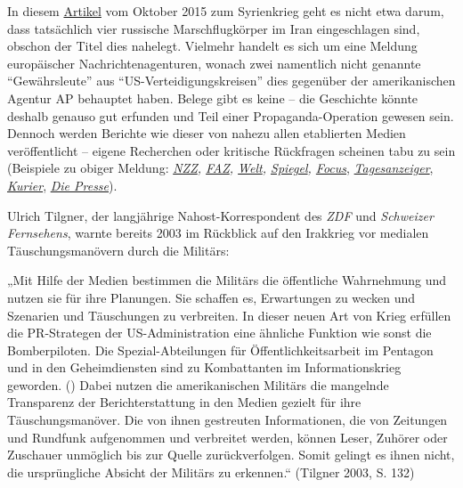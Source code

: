 In diesem
\href{http://www.tagesanzeiger.ch/ausland/asien-und-ozeanien/Vier-russische-Marschflugkoerper-im-Iran-eingeschlagen/story/19373226}{Artikel}
vom Oktober 2015 zum Syrienkrieg geht es nicht etwa darum, dass
tatsächlich vier russische Marschflugkörper im Iran eingeschlagen sind,
obschon der Titel dies nahelegt. Vielmehr handelt es sich um eine
Meldung europäischer Nachrichtenagenturen, wonach zwei namentlich nicht
genannte ``Gewährsleute'' aus ``US-Verteidigungskreisen'' dies gegenüber
der amerikanischen Agentur AP behauptet haben. Belege gibt es keine --
die Geschichte könnte deshalb genauso gut erfunden und Teil einer
Propaganda-Operation gewesen sein. Dennoch werden Berichte wie dieser
von nahezu allen etablierten Medien veröffentlicht -- eigene Recherchen
oder kritische Rückfragen scheinen tabu zu sein (Beispiele zu obiger
Meldung:
\emph{\href{http://www.nzz.ch/international/naher-osten-und-nordafrika/russische-raketen-offenbar-statt-in-syrien-im-iran-eingeschlagen-1.18626791}{NZZ},
\href{http://www.faz.net/aktuell/politik/ausland/naher-osten/auf-dem-weg-nach-syrien-sollen-russische-raketen-in-iran-eingeschlagen-sein-13846834.html}{FAZ},
\href{http://www.welt.de/politik/ausland/article147399821/Russische-Raketen-schlagen-offenbar-im-Iran-ein.html}{Welt},
\href{http://www.spiegel.de/politik/ausland/russische-raketen-laut-usa-in-iran-eingeschlagen-a-1056938.html}{Spiegel},
\href{http://www.focus.de/politik/ausland/us-offizielle-berichten-vier-russische-marschflugkoerper-im-iran-eingeschlagen_id_5001154.html}{Focus}},
\href{http://www.tagesanzeiger.ch/ausland/asien-und-ozeanien/Vier-russische-Marschflugkoerper-im-Iran-eingeschlagen/story/19373226}{\emph{Tagesanzeiger}},
\emph{\href{http://kurier.at/politik/ausland/russische-marschflugkoerper-im-iran-eingeschlagen/157.417.677}{Kurier}},
\href{http://diepresse.com/home/politik/aussenpolitik/4839232/USA_Russische-Marschflugkorper-im-Iran-eingeschlagen-}{\emph{Die
Presse}}).

Ulrich Tilgner, der langjährige Nahost-Korrespondent des \emph{ZDF} und
\emph{Schweizer Fernsehens}, warnte bereits 2003 im Rückblick auf den
Irakkrieg vor medialen Täuschungsmanövern durch die Militärs:

„Mit Hilfe der Medien bestimmen die Militärs die öffentliche Wahrnehmung
und nutzen sie für ihre Planungen. Sie schaffen es, Erwartungen zu
wecken und Szenarien und Täuschungen zu verbreiten. In dieser neuen Art
von Krieg erfüllen die PR-Strategen der US-Administration eine ähnliche
Funktion wie sonst die Bomberpiloten. Die Spezial-Abteilungen für
Öffentlichkeits­­arbeit im Pentagon und in den Geheim­diensten sind zu
Kombattanten im Informationskrieg geworden. () Dabei nutzen die
amerikanischen Militärs die mangelnde Transparenz der Bericht­erstattung
in den Medien gezielt für ihre Täuschungsmanöver. Die von ihnen
gestreuten Informationen, die von Zeitungen und Rundfunk aufgenommen und
verbreitet werden, können Leser, Zuhörer oder Zuschauer unmöglich bis
zur Quelle zurück­verfolgen. Somit gelingt es ihnen nicht, die
ursprüngliche Absicht der Militärs zu erkennen.`` (Tilgner 2003, S. 132)

